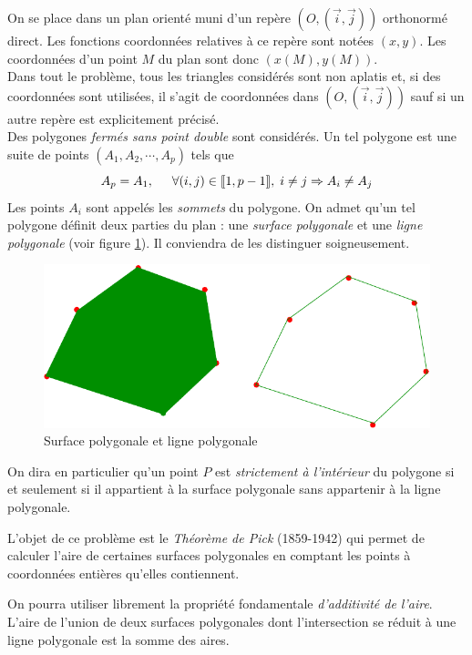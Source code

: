 On se place dans un plan orienté muni d'un repère $( O,(\overrightarrow i, \overrightarrow j))$ orthonormé direct. Les fonctions coordonnées relatives à ce repère sont notées $(x,y)$. Les coordonnées d'un point $M$ du plan sont donc $(x(M),y(M))$.\\
Dans tout le problème, tous les triangles considérés sont non aplatis et, si des coordonnées sont utilisées, il s'agit de coordonnées dans $( O,(\overrightarrow i, \overrightarrow j)) $ sauf si un autre repère est explicitement précisé.\\
Des polygones \emph{fermés sans point double} sont considérés. Un tel polygone est une suite de points $(A_1,A_2,\cdots,A_p)$ tels que
\begin{displaymath}
  A_p = A_1, \hspace{0.5cm} \forall(i,j)\in \llbracket 1,p-1\rrbracket,\; i\neq j \Rightarrow A_i \neq A_j
\end{displaymath}
Les points $A_i$ sont appelés les \emph{sommets} du polygone.\newline
On admet qu'un tel polygone définit deux parties du plan : une \emph{surface polygonale} et une \emph{ligne polygonale} (voir figure \ref{fig:Epick_1}). Il conviendra de les distinguer soigneusement.
\begin{figure}[!ht]
 \centering
 \includegraphics{./Epick_1.pdf}
 \caption{Surface polygonale et ligne polygonale}
 \label{fig:Epick_1}
\end{figure}
On dira en particulier qu'un point $P$ est \emph{strictement à l'intérieur} du polygone si et seulement si il appartient à la surface polygonale sans appartenir à la ligne polygonale.

L'objet de ce problème est le \emph{Théorème de Pick} (1859-1942) qui permet de calculer l'aire de certaines surfaces polygonales en comptant les points à coordonnées entières qu'elles contiennent.

On pourra utiliser librement la propriété fondamentale \emph{d'additivité de l'aire}. L'aire de l'union de deux surfaces polygonales dont l'intersection se réduit à une ligne polygonale est la somme des aires.

